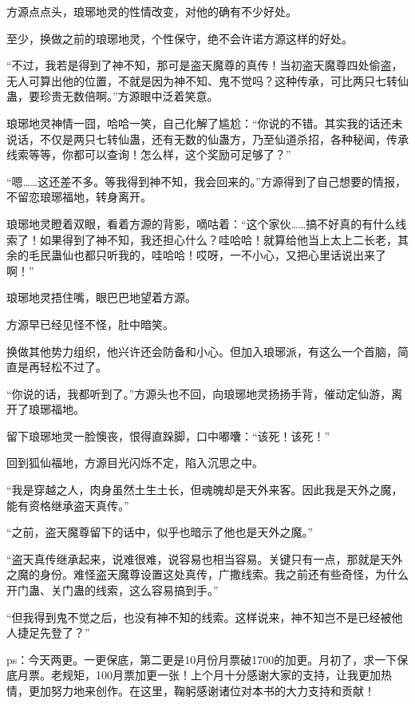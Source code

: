 \begin{this_body}
方源点点头，琅琊地灵的性情改变，对他的确有不少好处。

至少，换做之前的琅琊地灵，个性保守，绝不会许诺方源这样的好处。

“不过，我若是得到了神不知，那可是盗天魔尊的真传！当初盗天魔尊四处偷盗，无人可算出他的位置，不就是因为神不知、鬼不觉吗？这种传承，可比两只七转仙蛊，要珍贵无数倍啊。”方源眼中泛着笑意。

琅琊地灵神情一囧，哈哈一笑，自己化解了尴尬：“你说的不错。其实我的话还未说话，不仅是两只七转仙蛊，还有无数的仙蛊方，乃至仙道杀招，各种秘闻，传承线索等等，你都可以查询！怎么样，这个奖励可足够了？”

“嗯……这还差不多。等我得到神不知，我会回来的。”方源得到了自己想要的情报，不留恋琅琊福地，转身离开。

琅琊地灵瞪着双眼，看着方源的背影，嘀咕着：“这个家伙……搞不好真的有什么线索了！如果得到了神不知，我还担心什么？哇哈哈！就算给他当上太上二长老，其余的毛民蛊仙也都只听我的，哇哈哈！哎呀，一不小心，又把心里话说出来了啊！”

琅琊地灵捂住嘴，眼巴巴地望着方源。

方源早已经见怪不怪，肚中暗笑。

换做其他势力组织，他兴许还会防备和小心。但加入琅琊派，有这么一个首脑，简直是再轻松不过了。

“你说的话，我都听到了。”方源头也不回，向琅琊地灵扬扬手背，催动定仙游，离开了琅琊福地。

留下琅琊地灵一脸懊丧，恨得直跺脚，口中嘟囔：“该死！该死！”

回到狐仙福地，方源目光闪烁不定，陷入沉思之中。

“我是穿越之人，肉身虽然土生土长，但魂魄却是天外来客。因此我是天外之魔，能有资格继承盗天真传。”

“之前，盗天魔尊留下的话中，似乎也暗示了他也是天外之魔。”

“盗天真传继承起来，说难很难，说容易也相当容易。关键只有一点，那就是天外之魔的身份。难怪盗天魔尊设置这处真传，广撒线索。我之前还有些奇怪，为什么开门蛊、关门蛊的线索，这么容易搞到手。”

“但我得到鬼不觉之后，也没有神不知的线索。这样说来，神不知岂不是已经被他人捷足先登了？”

ps：今天两更。一更保底，第二更是10月份月票破1700的加更。月初了，求一下保底月票。老规矩，100月票加更一张！上个月十分感谢大家的支持，让我更加热情，更加努力地来创作。在这里，鞠躬感谢诸位对本书的大力支持和贡献！

\end{this_body}

